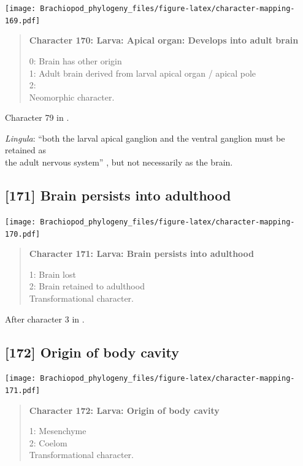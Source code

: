 \documentclass[openany]{book}
\begin{document}
\texttt{[image: Brachiopod\_phylogeny\_files/figure-latex/character-mapping-169.pdf]}

\begin{quote}
\textbf{Character 170: Larva: Apical organ: Develops into adult brain}

0: Brain has other origin\\
1: Adult brain derived from larval apical organ / apical pole\\
2:\\
Neomorphic character.
\end{quote}

Character 79 in \citet{Glenner2004}.

\hypertarget{Lingula-coding-170}{}
\emph{Lingula}: ``both the larval apical ganglion and the ventral
ganglion must be retained as\\
the adult nervous system'' \citep{HaySchmidt1992}, but not necessarily
as the brain.

\subsection*{{[}171{]} Brain persists into
adulthood}\label{brain-persists-into-adulthood}

\texttt{[image: Brachiopod\_phylogeny\_files/figure-latex/character-mapping-170.pdf]}

\begin{quote}
\textbf{Character 171: Larva: Brain persists into adulthood}

1: Brain lost\\
2: Brain retained to adulthood\\
Transformational character.
\end{quote}

After character 3 in \citet{Richter2010}.

\subsection*{{[}172{]} Origin of body
cavity}\label{origin-of-body-cavity}

\texttt{[image: Brachiopod\_phylogeny\_files/figure-latex/character-mapping-171.pdf]}

\begin{quote}
\textbf{Character 172: Larva: Origin of body cavity}

1: Mesenchyme\\
2: Coelom\\
Transformational character.
\end{quote}
\end{document}

